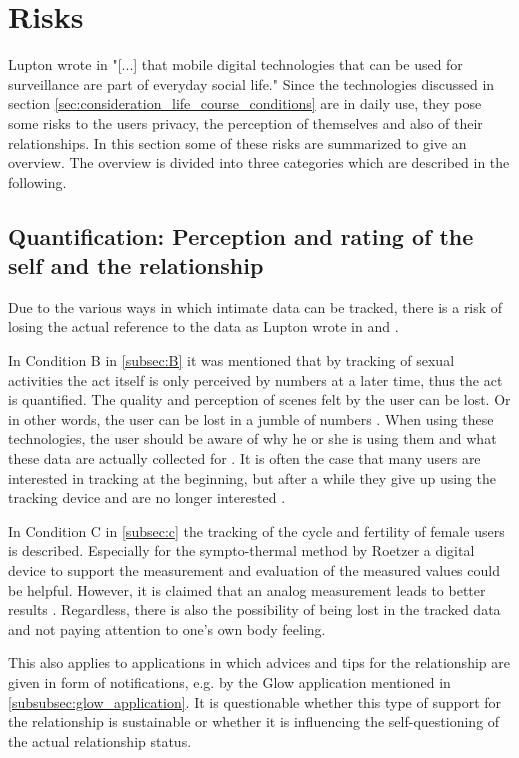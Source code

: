\section{Risks}
\label{sec:risks}
Lupton wrote in \cite{doi:10.1080/13691058.2014.920528} "[...] that mobile digital technologies that can be used for surveillance are part of everyday social life."
Since the technologies discussed in section \ref{sec:consideration_life_course_conditions} are in daily use, they pose some risks to the users privacy, the perception of themselves and also of their relationships.
In this section some of these risks are summarized to give an overview.
The overview is divided into three categories which are described in the following.

\subsection{Quantification: Perception and rating of the self and the relationship}
Due to the various ways in which intimate data can be tracked, there is a risk of losing the actual reference to the data as Lupton wrote in  \cite{doi:10.1080/13691058.2014.920528} and \cite{lupton2016quantified}.

In Condition B in \ref{subsec:B} it was mentioned that by tracking of sexual activities the act itself is only perceived by numbers at a later time, thus the act is quantified. The quality and perception of scenes felt by the user can be lost. Or in other words, the user can be lost in a jumble of numbers \cite{kelly2017inevitable}.
When using these technologies, the user should be aware of why he or she is using them and what these data are actually collected for \cite{doi:10.1080/15265161.2017.1409823}. 
It is often the case that many users are interested in tracking at the beginning, but after a while they give up using the tracking device and are no longer interested \cite{sjoklint2015complexities}.

In Condition C in \ref{subsec:c} the tracking of the cycle and fertility of female users is described. 
Especially for the sympto-thermal method by Roetzer a digital device to support the measurement and evaluation of the measured values could be helpful. However, it is claimed that an analog measurement leads to better results \cite{roetzer1968erweiterte}.
Regardless, there is also the possibility of being lost in the tracked data and not paying attention to one's own body feeling.

This also applies to applications in which advices and tips for the relationship are given in form of notifications, e.g. by the Glow application mentioned in \ref{subsubsec:glow_application}. It is questionable whether this type of support for the relationship is sustainable or whether it is influencing the self-questioning of the actual relationship status.

